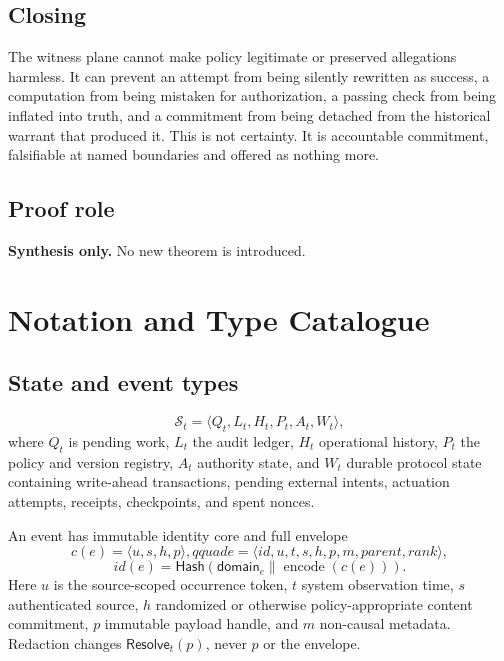 \documentclass[11pt,openany]{book}
\newcommand{\Hash}{\mathsf{Hash}}
\begin{document}
\section{Closing}
The witness plane cannot make policy legitimate or preserved allegations
harmless. It can prevent an attempt from being silently rewritten as success,
a computation from being mistaken for authorization, a passing check from
being inflated into truth, and a commitment from being detached from the
historical warrant that produced it. This is not certainty. It is accountable
commitment, falsifiable at named boundaries and offered as nothing more.

\section{Proof role}
\textbf{Synthesis only.} No new theorem is introduced.

\appendix

\chapter{Notation and Type Catalogue}
\section{State and event types}
\[
 \mathcal S_t=\langle Q_t,L_t,H_t,P_t,A_t,W_t\rangle ,
\]
where \(Q_t\) is pending work, \(L_t\) the audit ledger, \(H_t\) operational
history, \(P_t\) the policy and version registry, \(A_t\) authority state, and
\(W_t\) durable protocol state containing write-ahead transactions, pending
external intents, actuation attempts, receipts, checkpoints, and spent nonces.

An event has immutable identity core and full envelope
\[
 c(e)=\langle u,s,h,p\rangle,qquad
 e=\langle id,u,t,s,h,p,m,parent,rank\rangle ,
\]
\[
 id(e)=\Hash(\mathsf{domain}_e\parallel\operatorname{encode}(c(e))).
\]
Here \(u\) is the source-scoped occurrence token, \(t\) system observation
time, \(s\) authenticated source, \(h\) randomized or otherwise
policy-appropriate content commitment, \(p\) immutable payload handle, and
\(m\) non-causal metadata. Redaction changes
\(\mathsf{Resolve}_t(p)\), never \(p\) or the envelope.
\end{document}
